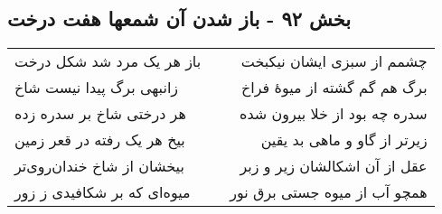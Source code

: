\begin{center}
\section*{بخش ۹۲ - باز شدن آن شمعها هفت درخت}
\label{sec:sh092}
\begin{longtable}{l p{0.5cm} r}
باز هر یک مرد شد شکل درخت
&&
چشمم از سبزی ایشان نیکبخت
\\
زانبهی برگ پیدا نیست شاخ
&&
برگ هم گم گشته از میوهٔ فراخ
\\
هر درختی شاخ بر سدره زده
&&
سدره چه بود از خلا بیرون شده
\\
بیخ هر یک رفته در قعر زمین
&&
زیرتر از گاو و ماهی بد یقین
\\
بیخشان از شاخ خندان‌روی‌تر
&&
عقل از آن اشکالشان زیر و زبر
\\
میوه‌ای که بر شکافیدی ز زور
&&
همچو آب از میوه جستی برق نور
\\
\end{longtable}
\end{center}
